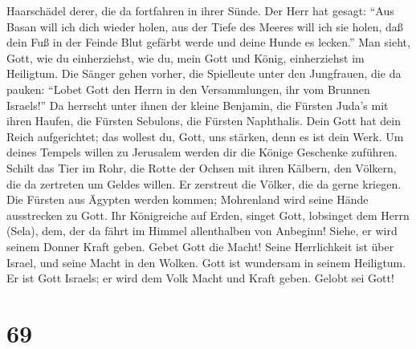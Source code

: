 Haarschädel derer, die da fortfahren in ihrer Sünde.  Der
Herr hat gesagt: ``Aus Basan will ich dich wieder holen, aus der Tiefe
des Meeres will ich sie holen,  daß dein Fuß in der Feinde
Blut gefärbt werde und deine Hunde es lecken.''  Man sieht,
Gott, wie du einherziehst, wie du, mein Gott und König, einherziehst im
Heiligtum.  Die Sänger gehen vorher, die Spielleute unter
den Jungfrauen, die da pauken:  ``Lobet Gott den Herrn in
den Versammlungen, ihr vom Brunnen Israels!''  Da herrscht
unter ihnen der kleine Benjamin, die Fürsten Juda's mit ihren Haufen,
die Fürsten Sebulons, die Fürsten Naphthalis.  Dein Gott
hat dein Reich aufgerichtet; das wollest du, Gott, uns stärken, denn es
ist dein Werk.  Um deines Tempels willen zu Jerusalem
werden dir die Könige Geschenke zuführen.  Schilt das Tier
im Rohr, die Rotte der Ochsen mit ihren Kälbern, den Völkern, die da
zertreten um Geldes willen. Er zerstreut die Völker, die da gerne
kriegen.  Die Fürsten aus Ägypten werden kommen; Mohrenland
wird seine Hände ausstrecken zu Gott.  Ihr Königreiche auf
Erden, singet Gott, lobsinget dem Herrn (Sela),  dem, der
da fährt im Himmel allenthalben von Anbeginn! Siehe, er wird seinem
Donner Kraft geben.  Gebet Gott die Macht! Seine
Herrlichkeit ist über Israel, und seine Macht in den Wolken.
 Gott ist wundersam in seinem Heiligtum. Er ist Gott
Israels; er wird dem Volk Macht und Kraft geben. Gelobt sei Gott!

\hypertarget{section-68}{%
\section{69}\label{section-68}}

